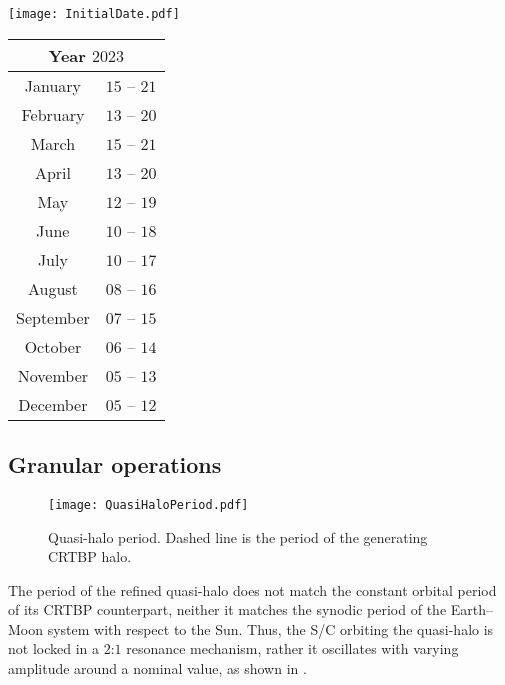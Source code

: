 %
\begin{minipage}{\textwidth}
	\begin{minipage}[t!]{0.6\textwidth}
		\centering
		\texttt{[image: InitialDate.pdf]}
		\label{fig:InitialDateLUMIO}
	\end{minipage}
	\hfill
	\begin{minipage}[t!]{0.39\textwidth}
		\centering
		\begin{tabular}{cc}
			\toprule
			\multicolumn{2}{c}{Year $2023$} \\
			\midrule
			January & $15$ -- $21$ \\
			February & $13$ -- $20$ \\
			March & $15$ -- $21$ \\
			April & $13$ -- $20$ \\
			May & $12$ -- $19$ \\
			June & $10$ -- $18$ \\
			July & $10$ -- $17$ \\
			August & $08$ -- $16$ \\
			September & $07$ -- $15$ \\
			October & $06$ -- $14$ \\
			November & $05$ -- $13$ \\
			December & $05$ -- $12$ \\
			\bottomrule
		\end{tabular}
		\label{tab:InitialDateLUMIO}
	\end{minipage}
\end{minipage}
%



\subsection{Granular operations}\label{subsec:granularops}
%
\begin{wrapfigure}{}{\wrapTPM}
	\vspace*{-0.3cm}
	\centering
	\texttt{[image: QuasiHaloPeriod.pdf]}
	\caption[Operative quasi-halo period.]{Quasi-halo period. Dashed line is the period of the generating CRTBP halo.}
	\label{fig:QuasiHaloPeriod}
\end{wrapfigure}
%
The period of the refined quasi-halo does not match the constant orbital period of its {CRTBP} counterpart, neither it matches the synodic period of the Earth--Moon system with respect to the Sun. Thus, the S/C orbiting the quasi-halo is not locked in a $2$:$1$ resonance mechanism, rather it oscillates with varying amplitude around a nominal value, as shown in .

